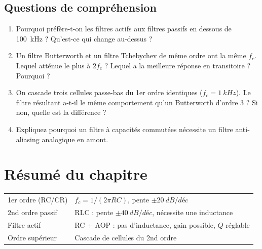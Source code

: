\documentclass[12pt,a4paper,twoside]{book}
\begin{document}
\subsection*{Questions de compréhension}

\begin{enumerate}[nosep]
\item Pourquoi préfère-t-on les filtres actifs aux filtres passifs en dessous de \SI{100}{kHz} ? Qu'est-ce qui change au-dessus ?
\item Un filtre Butterworth et un filtre Tchebychev de même ordre ont la même $f_c$. Lequel atténue le plus à $2f_c$ ? Lequel a la meilleure réponse en transitoire ? Pourquoi ?
\item On cascade trois cellules passe-bas du 1er ordre identiques ($f_c = \SI{1}{kHz}$). Le filtre résultant a-t-il le même comportement qu'un Butterworth d'ordre 3 ? Si non, quelle est la différence ?
\item Expliquez pourquoi un filtre à capacités commutées nécessite un filtre anti-aliasing analogique en amont.
\end{enumerate}

\section*{Résumé du chapitre}

\begin{bases}[title={\color{white} Résumé --- Les Bases}]
\begin{center}
\renewcommand{\arraystretch}{1.3}
\begin{tabular}{p{4cm}p{9cm}}
\toprule
1er ordre (RC/CR) & $f_c = 1/(2\pi RC)$, pente $\pm\SI{20}{dB/déc}$ \\
2nd ordre passif & RLC : pente $\pm\SI{40}{dB/déc}$, nécessite une inductance \\
Filtre actif & RC + AOP : pas d'inductance, gain possible, $Q$ réglable \\
Ordre supérieur & Cascade de cellules du 2nd ordre \\
\bottomrule
\end{tabular}
\end{center}
\end{bases}
\end{document}
